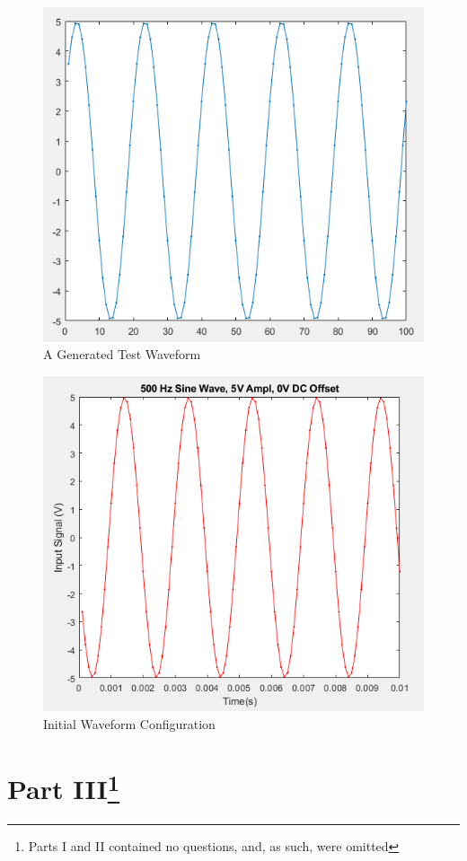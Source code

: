 \documentclass[
	letterpaper, %
	10pt, %
]{CSUniSchoolLabReport}
\begin{document}
  \begin{figure}[h!]
    \centering
    \includegraphics[width=.9\textwidth]{Figures/L8PL.png}
    \caption{A Generated Test Waveform}
    \label{fig:1}
  \end{figure}

  \begin{figure}[h!]
    \centering
    \includegraphics[width=.9\textwidth]{Figures/L8P2.png}
    \caption{Initial Waveform Configuration}
    \label{fig:2}
  \end{figure}

  \section{Part III\footnote{Parts I and II contained no questions, and, as such, were omitted}}
\end{document}
